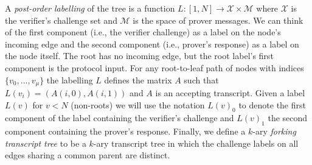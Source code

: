 \documentclass{article}
\theoremstyle{definition}
\begin{document}
A \emph{post-order labelling} of the tree is a function $L:[1,N] \rightarrow \mathcal{X} \times \mathcal{M}$ where $\mathcal{X}$ is the verifier's challenge set and $\mathcal{M}$ is the space of prover messages. We can think of the first component (i.e., the verifier challenge) as a label on the node's incoming edge and the second component (i.e., prover's response) as a label on the node itself. The root has no incoming edge, but the root label's first component is the protocol input. For any root-to-leaf path of nodes with indices $\{v_0,...,v_\mu\}$ the labelling $L$ defines the matrix $A$ such that $L(v_i) = (A(i, 0), A(i, 1))$ and $A$ is an accepting transcript. Given a label $L(v)$ for $v < N$ (non-roots) we will use the notation $L(v)_0$ to denote the first component of the label containing the verifier's challenge and $L(v)_1$ the second component containing the prover's response. Finally, we define a $k$-ary \emph{forking transcript tree} to be a $k$-ary transcript tree in which the challenge labels on all edges sharing a common parent are distinct.
\end{document}

